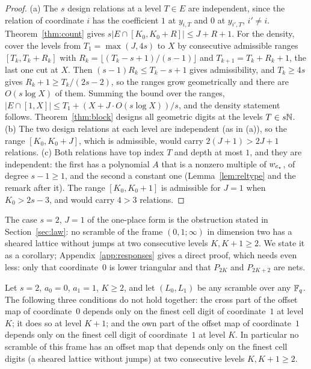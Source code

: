 \begin{proof}
(a) The $s$ design relations at a level $T\in E$ are independent, since the relation of coordinate $i$ has the coefficient $1$ at $y_{i,T}$ and $0$ at $y_{i',T}$, $i'\ne i$. Theorem~\ref{thm:count} gives $s|E\cap[K_0,K_0+R]|\le J+R+1$. For the density, cover the levels from $T_1=\max(J,4s)$ to $X$ by consecutive admissible ranges $[T_k,T_k+R_k]$ with $R_k=\lfloor(T_k-s+1)/(s-1)\rfloor$ and $T_{k+1}=T_k+R_k+1$, the last one cut at $X$. Then $(s-1)R_k\le T_k-s+1$ gives admissibility, and $T_k\ge4s$ gives $R_k+1\ge T_k/(2s-2)$, so the ranges grow geometrically and there are $O(s\log X)$ of them. Summing the bound over the ranges, $|E\cap[1,X]|\le T_1+(X+J\cdot O(s\log X))/s$, and the density statement follows. Theorem~\ref{thm:block} designs all geometric digits at the levels $T\in s\mathbb{N}$.
(b) The two design relations at each level are independent (as in (a)), so the range $[K_0,K_0+J]$, which is admissible, would carry $2(J+1)>2J+1$ relations.
(c) Both relations have top index $T$ and depth at most $1$, and they are independent: the first has a polynomial $A$ that is a nonzero multiple of $w_{c_{\star}}$, of degree $s-1\ge1$, and the second a constant one (Lemma~\ref{lem:reltype} and the remark after it). The range $[K_0,K_0+1]$ is admissible for $J=1$ when $K_0>2s-3$, and would carry $4>3$ relations.
\end{proof}

The case $s=2$, $J=1$ of the one-place form is the obstruction stated in Section~\ref{sec:law}: no scramble of the frame $(0,1;\infty)$ in dimension two has a sheared lattice without jumps at two consecutive levels $K,K+1\ge2$. We state it as a corollary; Appendix~\ref{app:responses} gives a direct proof, which needs even less: only that coordinate~$0$ is lower triangular and that $P_{2K}$ and $P_{2K+2}$ are nets.

\begin{corollary}\label{cor:N1}
Let $s=2$, $a_0=0$, $a_1=1$, $K\ge2$, and let $(L_0,L_1)$ be any scramble over any $\mathbb{F}_q$. The following three conditions do not hold together: the cross part of the offset map of coordinate~$0$ depends only on the finest cell digit of coordinate~$1$ at level $K$; it does so at level $K+1$; and the own part of the offset map of coordinate~$1$ depends only on the finest cell digit of coordinate~$1$ at level $K$. In particular no scramble of this frame has an offset map that depends only on the finest cell digits (a sheared lattice without jumps) at two consecutive levels $K,K+1\ge2$.
\end{corollary}

